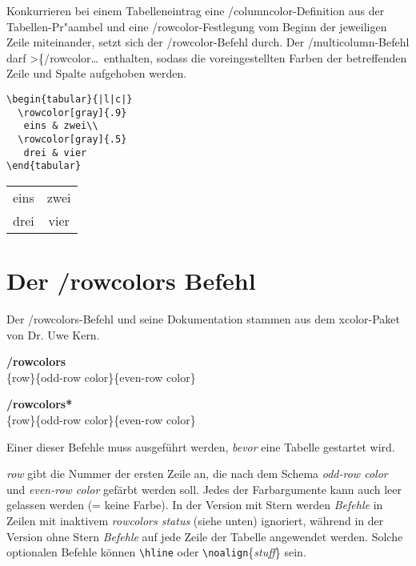 \documentclass[ngerman]{article}
\begin{document}
Konkurrieren bei einem Tabelleneintrag eine \slash \textsf{columncolor}-Definition aus der
Tabellen-Pr"aambel und eine \slash \textsf{rowcolor}-Festlegung vom Beginn der jeweiligen 
Zeile miteinander, setzt sich der \slash \textsf{rowcolor}-Befehl durch. Der 
\slash \textsf{multicolumn}-Befehl darf >\{\slash \textsf{rowcolor}\ldots\ enthalten, 
sodass die voreingestellten Farben der betreffenden Zeile und Spalte aufgehoben werden.
\begin{center}
\begin{minipage}{.75\textwidth}
\begin{verbatim}
\begin{tabular}{|l|c|}
  \rowcolor[gray]{.9}
   eins & zwei\\
  \rowcolor[gray]{.5}
   drei & vier
\end{tabular}
\end{verbatim}
\end{minipage}
 {\bfseries
  \begin{tabular}{|l|c|}
  \rowcolor[gray]{.9}
  eins & zwei\\
  \rowcolor[gray]{.5}
  drei & vier
  \end{tabular}}
 \end{center}


\section{Der \slash \textsf{rowcolors} Befehl}
Der \slash \textsf{rowcolors}-Befehl und seine Dokumentation stammen aus dem \textsf{xcolor}-Paket
von Dr. Uwe Kern.

\textbf{\slash rowcolors}\\\relax
  [commands]\{row\}\{odd-row color\}\{even-row color\}

\textbf{\slash rowcolors*}\\\relax
  [commands]\{row\}\{odd-row color\}\{even-row color\}

Einer dieser Befehle muss ausgeführt werden, \emph{bevor} eine Tabelle gestartet wird.

\emph{row} gibt die Nummer der ersten Zeile an, die nach dem Schema \emph{odd-row color} und \emph{even-row color} gefärbt werden soll.
Jedes der Farbargumente kann auch leer gelassen werden (= keine Farbe).
In der Version mit Stern werden \emph{Befehle} in Zeilen mit inaktivem \emph{rowcolors status} (siehe unten) ignoriert, während in der Version ohne Stern \emph{Befehle} auf jede Zeile der Tabelle angewendet werden.
Solche optionalen Befehle können \verb"\hline" oder \verb"\noalign"\{\emph{stuff}\} sein.
\end{document}
